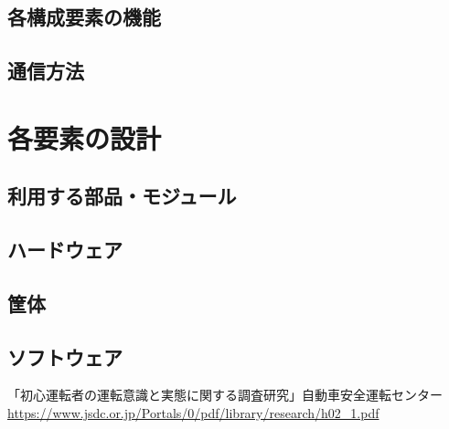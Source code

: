 \documentclass[titlepage,a4paper]{jsarticle}
\begin{document}
\subsection{各構成要素の機能}
\subsection{通信方法}
\section{各要素の設計}
\subsection{利用する部品・モジュール}
\subsection{ハードウェア}
\subsection{筐体}
\subsection{ソフトウェア}

\begin{thebibliography}{99}
   「初心運転者の運転意識と実態に関する調査研究」自動車安全運転センター\\
  \url{https://www.jsdc.or.jp/Portals/0/pdf/library/research/h02_1.pdf}

\end{thebibliography}
\end{document}
